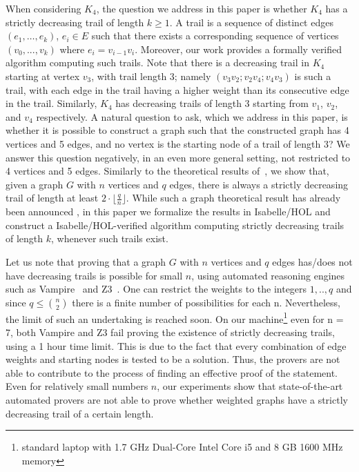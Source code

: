 \begin{isabellebody}
\begin{isamarkuptext}
\noindent When considering $K_4$, the question we address in this paper is whether $K_4$ has a 
strictly decreasing trail of length $k\geq 1$. A trail is a sequence of distinct edges $(e_1,\ldots,e_k)$, $e_i \in E$ such that
there exists a corresponding sequence of vertices $(v_0,...,v_k)$ where $e_i = v_{i-1}v_i$. 
Moreover, our work provides a formally verified algorithm 
computing such trails. Note that there is a decreasing trail in $K_4$ starting at vertex $v_3$, 
with trail length 3; namely $(v_3v_2; v_2v_4; v_4v_3)$ is such a trail, with each edge in the trail having 
a higher weight than its consecutive edge in the trail. Similarly, $K_4$ has decreasing trails of 
length 3 starting from $v_1$, $v_2$, and $v_4$ respectively. A natural question to ask,
which we address in this paper, is whether it is possible to construct a graph such that the 
 constructed graph has 4 vertices and 5 edges, and no vertex is the starting node of a trail of 
length 3? We answer this question negatively, in an even more general setting,  not restricted to 4 
vertices and 5 edges. Similarly to the theoretical results of~\cite{graham1973increasing}, we show 
that, given a graph $G$ with $n$ vertices and $q$ edges, there is always a strictly decreasing trail of length at least
$2 \cdot \lfloor\frac{q}{n}\rfloor$. While such a graph theoretical result has already been announced 
\cite{graham1973increasing}, in this paper we formalize the results in Isabelle/HOL and construct 
a Isabelle/HOL-verified algorithm computing strictly decreasing trails of length $k$, whenever such trails exist.

Let us note that proving that a
 graph $G$ with $n$ vertices and $q$ edges has/does not have decreasing trails is possible for small 
$n$, using automated reasoning engines such as Vampire~\cite{Vampire13} and Z3~\cite{de2008z3}. 
One can restrict the weights to the integers $1,..,q$ and since $q \le {n \choose 2}$ there is a 
finite number of possibilities for each n. 
Nevertheless, the limit of such an undertaking is
reached soon. On our machine\footnote{standard laptop with
1.7 GHz Dual-Core Intel Core i5 and  8 GB 1600 MHz memory} even for n = 7, both Vampire and Z3 fail 
proving the existence of strictly decreasing trails, using a 1 hour time limit. This
is due to the fact that every combination of edge weights and starting nodes is
tested to be a solution. Thus, the provers are not able to contribute to the process of finding an 
effective proof of the statement. Even for relatively small numbers $n$, our experiments show that 
state-of-the-art automated  provers are not able to prove whether weighted graphs have a strictly decreasing trail 
of a certain length.


\end{isamarkuptext}
\end{isabellebody}
